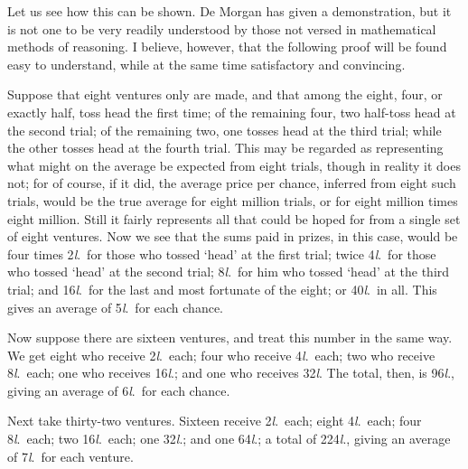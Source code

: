 \documentclass[letterpaper,12pt,oneside,openany]{memoir}
\begin{document}
Let us see how this can be shown. De Morgan has
given a demonstration, but it is not one to be very
readily understood by those not versed in mathematical
methods of reasoning. I believe, however, that the
following proof will be found easy to understand, while
at the same time satisfactory and convincing.

Suppose that eight ventures only are made, and
that among the eight, four, or exactly half, toss head
the first time; of the remaining four, two half-toss
head at the second trial; of the remaining two, one
tosses head at the third trial; while the other tosses
head at the fourth trial. This may be regarded as
representing what might on the average be expected
from eight trials, though in reality it does not; for of
course, if it did, the average price per chance, inferred
from eight such trials, would be the true average for
eight million trials, or for eight million times eight
million. Still it fairly represents all that could be
hoped for from a single set of eight ventures. Now
we see that the sums paid in prizes, in this case,
would be four times 2\textit{l}.\ for those who tossed `head' at
the first trial; twice 4\textit{l}.\ for those who tossed `head' at
the second trial; 8\textit{l}.\ for him who tossed `head' at the
third trial; and 16\textit{l}.\ for the last and most fortunate of
the eight; or 40\textit{l}.\ in all. This gives an average of 5\textit{l}.\ for
each chance.

Now suppose there are sixteen ventures, and treat
this number in the same way. We get eight who
receive 2\textit{l}.\ each; four who receive 4\textit{l}.\ each; two who
receive 8\textit{l}.\ each; one who receives 16\textit{l}.; and one who
receives 32\textit{l}. The total, then, is 96\textit{l}., giving an average
of 6\textit{l}.\ for each chance.

Next take thirty-two ventures. Sixteen receive 2\textit{l}.\ each;
eight 4\textit{l}.\ each; four 8\textit{l}.\ each; two 16\textit{l}.\ each;
one 32\textit{l}.; and one 64\textit{l}.; a total of 224\textit{l}., giving an
average of 7\textit{l}.\ for each venture.
\end{document}
